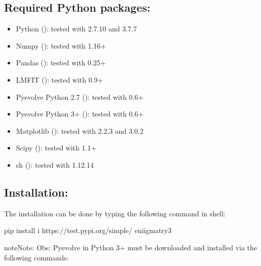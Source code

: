 \documentclass[letterpaper,10pt,english]{sphinxmanual}
\begin{document}
\subsection{Required Python packages:}
\label{\detokenize{beforeyoubegin:required-python-packages}}\begin{itemize}
\item {} 
Python (): tested with 2.7.10 and 3.7.7

\item {} 
Numpy (): tested with 1.16+

\item {} 
Pandas (): tested with 0.25+

\item {} 
LMFIT (): tested with 0.9+

\item {} 
Pyevolve \sphinxhyphen{} Python 2.7 (): tested with 0.6+

\item {} 
Pyevolve \sphinxhyphen{} Python 3+ (): tested with 0.6+

\item {} 
Matplotlib (): tested with 2.2.3 and 3.0.2

\item {} 
Scipy (): tested with 1.1+

\item {} 
sh (): tested with 1.12.14

\end{itemize}


\subsection{Installation:}
\label{\detokenize{beforeyoubegin:installation}}
The installation can be done by typing the following command in shell:

\begin{sphinxVerbatim}[commandchars=\\\{\}]
\PYGZdl{}pip install \PYGZhy{}i https://test.pypi.org/simple/ eniigma\PYGZhy{}try3
\end{sphinxVerbatim}

\begin{sphinxadmonition}{note}{Note:}
Obs: Pyevolve in Python 3+ must be downloaded and installed via the following commands:
\end{sphinxadmonition}
\end{document}

